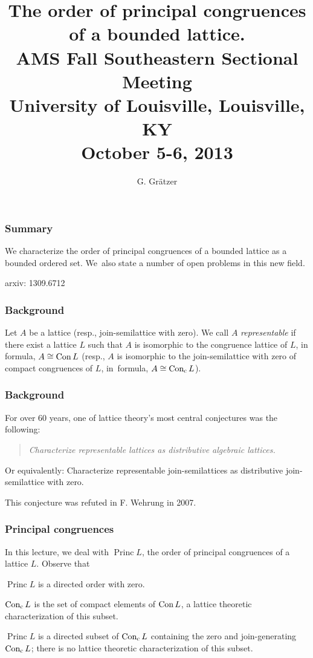 \documentclass[leqno]{beamer}
\DeclareMathOperator{\Princ}{Princ}
\DeclareMathOperator{\Conc}{\tup{Con}_\tup{c}}
\begin{document}
 
\title[The order of principal congruences of a bounded lattice]{The order of principal congruences\\ of a bounded lattice.\\
AMS Fall Southeastern Sectional Meeting\\
University of Louisville, Louisville, KY\\ 
October 5-6, 2013}
\author{G. Gr\"atzer}
\date{}
\maketitle 

\begin{frame}
\frametitle{Summary}
We characterize the order of principal congruences 
of a bounded lattice 
as a bounded ordered set.
We~also state a number of open problems in this new field.
\medskip 
 

arxiv: 1309.6712 
\end{frame}

\begin{frame}
\frametitle{Background}
Let $A$ be a lattice (resp., join-semilattice with zero). 
We call $A$ \emph{representable} 
if there exist a lattice $L$
such that $A$ is isomorphic to the congruence lattice of $L$, 
in formula, $A \cong \operatorname{Con} L$ 
(resp., $A$ is isomorphic to the join-semilattice with zero
of compact congruences of $L$, 
in~formula, $A \iso \Conc L$).
\end{frame}

\begin{frame}
\frametitle{Background}
For over 60 years, one of lattice theory's most central conjectures 
was the following:
\begin{quote}
\emph{Characterize representable lattices as distributive algebraic lattices.}
\end{quote}
\pause
Or equivalently:
Characterize representable join-semilattices as distributive join-semilattice with zero.
\pause

This conjecture was refuted in F. Wehrung in 2007.
\end{frame}

\begin{frame}
\frametitle{Principal congruences}
In this lecture, we deal with $\Princ L$, 
the order of principal congruences of a lattice $L$.
Observe that 
\begin{enumeratea}

\item $\Princ L$ is a directed order with zero.
\pause
\item $\Conc L$ is the set of compact elements of $\operatorname{Con} L$, 
a lattice theoretic characterization of this subset.
\pause
\item $\Princ L$ is a directed subset of $\Conc L$ 
containing the zero and join-generat\-ing $\Conc L$;
there is no lattice theoretic characterization of this subset.
\end{enumeratea}
\end{frame}
\end{document}
